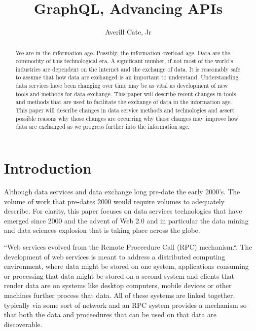 
\title{GraphQL, Advancing APIs}

\author{Averill Cate, Jr}

\renewcommand{\shortauthors}{A. Cate, Jr}

\begin{abstract}
We are in the information age.  Possibly, the information overload age.
Data are the commodity of this technological era.  A significant number, if not
most of the world's industries are dependent on the internet and the exchange
of data.  It is reasonably safe to assume that how data are exchanged is
an important to understand.  Understanding data services have been changing
over time may be as vital as development of new tools and methods for data
exchange.  This paper will describe recent changes in tools and methods that
are used to facilitate the exchange of data in the information age.  This paper
will describe changes in data service methods and technologies and assert possible 
reasons why those changes are occurring why those changes may improve how data 
are exchanged as we progress further into the information age.
\end{abstract}


\maketitle

\section{Introduction}
Although data services and data exchange long pre-date the early 2000's.  The
volume of work that pre-dates 2000 would require volumes to adequately describe.
For clarity, this paper focuses on data services technologies that have emerged
since 2000 and the advent of Web 2.0 and in particular the data mining and
data sciences explosion that is taking place across the globe.

``Web services evolved from the Remote Proceedure Call (RPC) mechanism.``\cite{Kalin2009}.  
The development of web services is meant to address a distributed computing 
environment, where data might be stored on one system, applications consuming 
or processing that data might be stored on a second system and clients that 
render data are on systems like desktop computers, mobile devices or other 
machines further process that data.  All of these systems are linked together, 
typically via some sort of network and an RPC system provides a mechanism so 
that both the data and proceedures that can be used on that data are 
discoverable\cite{Kalin2009}.

